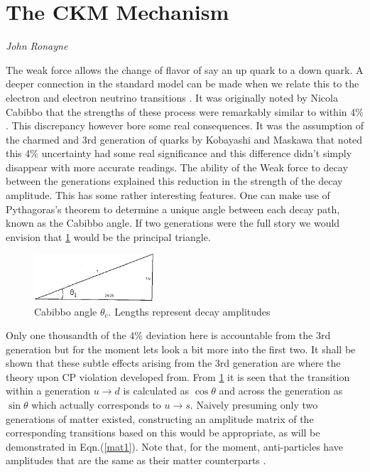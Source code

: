 %
\section{The CKM Mechanism}
\vspace{-1.0em}
\begin{center}
\tiny{\textit{John Ronayne}}
\end{center}

The weak force allows the change of flavor of say an up quark to a down quark. A deeper connection in the standard model can be made when we relate this to the electron and electron neutrino transitions \cite{CKM8}. It was originally noted by Nicola Cabibbo that the strengths of these process were remarkably similar to within 4$\%$. This discrepancy however bore some real consequences. It was the assumption of the charmed and 3rd generation of quarks by Kobayashi and Maskawa that noted this 4$\%$ uncertainty had some real significance and this difference didn't simply disappear with more accurate readings. The ability of the Weak force to decay between the generations explained this reduction in the strength of the decay amplitude. This has some rather interesting features. One can make use of Pythagoras's theorem to determine a unique angle between each decay path, known as the Cabibbo angle. If two generations were the full story we would envision that \cref{cabibbo} would be the principal triangle.

\begin{figure}[h]
\centering
\includegraphics[angle=1, width=0.4\textwidth]{figs/ckmfig1.jpg}
\caption{Cabibbo angle $\theta_c$. Lengths represent decay amplitudes}
\label{cabibbo}
\end{figure}

Only one thousandth of the $4\%$ deviation here is accountable from the 3rd generation but for the moment lets look a bit more into the first two.
It shall be shown that these subtle effects arising from the 3rd generation are where the theory upon CP violation developed from. From \cref{cabibbo} it is seen that the transition within a generation $u\rightarrow d$ is calculated as $\cos\theta$ and across the generation as $\sin\theta$ which actually corresponds to $u\rightarrow s$. Naively presuming only two generations of matter existed, constructing an amplitude matrix of the corresponding transitions based on this would be appropriate, as will be demonstrated in Eqn.(\ref{mat1}). Note that, for the moment, anti-particles have amplitudes that are the same as their matter counterparts \cite{CKM1}.

